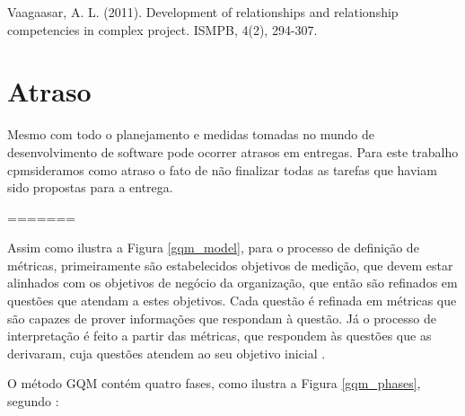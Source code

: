     Vaagaasar, A. L. (2011). Development of relationships and relationship competencies in complex project. ISMPB, 4(2), 294-307.


  \section{Atraso}

    Mesmo com todo o planejamento e medidas tomadas no mundo de desenvolvimento de software pode ocorrer atrasos em entregas. Para este trabalho cpmsideramos como atraso o fato de não finalizar todas as tarefas que haviam sido propostas para a entrega.





=======
    
    Assim como ilustra a Figura \ref{gqm_model}, para o processo de definição de métricas, primeiramente são estabelecidos objetivos
    de medição, que devem estar alinhados com os objetivos de negócio da organização,
    que então são refinados em questões que atendam a estes objetivos. Cada questão é refinada em métricas que são
    capazes de prover informações que respondam à questão. Já o processo de interpretação é feito a partir das métricas, que respondem
    às questões que as derivaram, cuja questões atendem ao seu objetivo inicial \cite{solingen99}.
    
    O método GQM contém quatro fases, como ilustra a Figura \ref{gqm_phases}, segundo :
    

